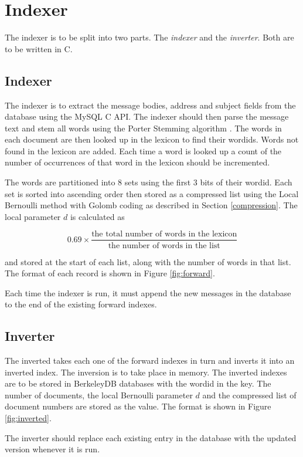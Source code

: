 \section{Indexer}
The indexer is to be split into two parts.  The \emph{indexer} and the \emph{inverter}.  Both are to be written in C.

\subsection{Indexer}
The indexer is to extract the message bodies, address and subject fields from the database using the MySQL C API.  The indexer should then parse the message text and stem all words using the Porter Stemming algorithm \cite{porter80}.  The words in each document are then looked up in the lexicon to find their wordids.  Words not found in the lexicon are added.  Each time a word is looked up a count of the number of occurrences of that word in the lexicon should be incremented.

The words are partitioned into 8 sets using the first 3 bits of their wordid.  Each set is sorted into ascending order then stored as a compressed list using the Local Bernoulli method with Golomb coding as described in Section \ref{compression}.  The local parameter $d$ is calculated as

\[
0.69 \times \frac{\textrm{the total number of words in the lexicon}}{\textrm{the number of words in the list}}
\]

and stored at the start of each list, along with the number of words in that list.  The format of each record is shown in Figure \ref{fig:forward}.

Each time the indexer is run, it must append the new messages in the database to the end of the existing forward indexes.

\subsection{Inverter}
The inverted takes each one of the forward indexes in turn and inverts it into an inverted index.  The inversion is to take place in memory.  The inverted indexes are to be stored in BerkeleyDB databases with the wordid in the key.  The number of documents, the local Bernoulli parameter $d$ and the compressed list of document numbers are stored as the value.  The format is shown in Figure \ref{fig:inverted}.

The inverter should replace each existing entry in the database with the updated version whenever it is run.

